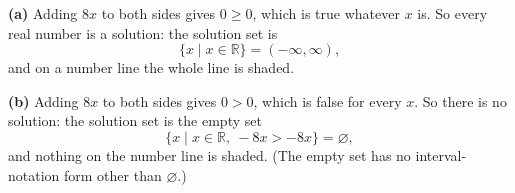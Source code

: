 \textbf{(a)} Adding $8x$ to both sides gives $0\ge0$, which is true whatever $x$ is. So every real number is a solution: the solution set is
\[
\boxed{\{x\mid x\in\mathbb{R}\}=(-\infty,\infty)},
\]
and on a number line the whole line is shaded.

\textbf{(b)} Adding $8x$ to both sides gives $0>0$, which is false for every $x$. So there is no solution: the solution set is the empty set
\[
\boxed{\{x\mid x\in\mathbb{R},\ -8x>-8x\}=\varnothing},
\]
and nothing on the number line is shaded. (The empty set has no interval-notation form other than $\varnothing$.)
